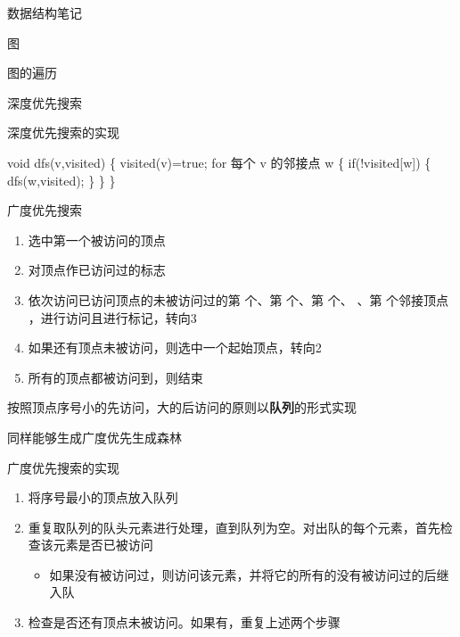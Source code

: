 \documentclass[
  ignorenonframetext,
]{beamer}
\newenvironment{Shaded}{}{}
\newcommand{\NormalTok}[1]{#1}
\providecommand{\tightlist}{%
  \setlength{\itemsep}{0pt}\setlength{\parskip}{0pt}}
\begin{document}
\begin{frame}[fragile]{数据结构笔记}
\begin{block}{图}
\begin{block}{图的遍历}
\begin{block}{深度优先搜索}
\begin{block}{深度优先搜索的实现}
\begin{Shaded}
\begin{Highlighting}[]
\NormalTok{void dfs(v,visited)}
\NormalTok{\{}
\NormalTok{  visited(v)=true;}
\NormalTok{  for 每个 v 的邻接点 w}
\NormalTok{  \{}
\NormalTok{    if(!visited[w])}
\NormalTok{    \{}
\NormalTok{      dfs(w,visited);}
\NormalTok{    \}}
\NormalTok{  \}}
\NormalTok{\}}
\end{Highlighting}
\end{Shaded}
\end{block}
\end{block}

\begin{block}{广度优先搜索}
\protect{}\label{ux5e7fux5ea6ux4f18ux5148ux641cux7d22}
\begin{enumerate}
\tightlist
\item
  选中第一个被访问的顶点
\item
  对顶点作已访问过的标志
\item
  依次访问已访问顶点的未被访问过的第 {} 个、第 {} 个、第 {} 个、{} 、第
  {} 个邻接顶点 {} ，进行访问且进行标记，转向3
\item
  如果还有顶点未被访问，则选中一个起始顶点，转向2
\item
  所有的顶点都被访问到，则结束
\end{enumerate}

按照顶点序号小的先访问，大的后访问的原则以\textbf{队列}的形式实现

同样能够生成广度优先生成森林

\begin{block}{广度优先搜索的实现}
\protect{}\label{ux5e7fux5ea6ux4f18ux5148ux641cux7d22ux7684ux5b9eux73b0}
\begin{enumerate}
\tightlist
\item
  将序号最小的顶点放入队列
\item
  重复取队列的队头元素进行处理，直到队列为空。对出队的每个元素，首先检查该元素是否已被访问

  \begin{itemize}
  \tightlist
  \item
    如果没有被访问过，则访问该元素，并将它的所有的没有被访问过的后继入队
  \end{itemize}
\item
  检查是否还有顶点未被访问。如果有，重复上述两个步骤
\end{enumerate}


\end{block}
\end{block}
\end{block}
\end{block}
\end{frame}
\end{document}
